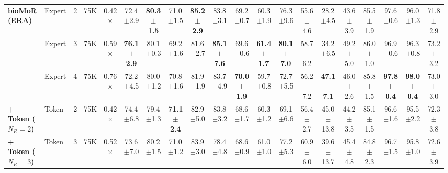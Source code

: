{\begin{tabular}{l l c c c c c c c c c c c c c c c c c c}
\midrule
\textbf{bioMoR (ERA)} & Expert & 2 & 75K & 0.42$\times$ & 72.4{\scriptsize$\pm$2.9} & \cellcolor{bestgreen}\textbf{80.3{\scriptsize$\pm$1.5}} & 71.0{\scriptsize$\pm$1.5} & \cellcolor{bestgreen}\textbf{85.2{\scriptsize$\pm$2.9}} & 83.8{\scriptsize$\pm$3.1} & 69.2{\scriptsize$\pm$0.7} & 60.3{\scriptsize$\pm$1.9} & 76.3{\scriptsize$\pm$9.6} & 55.6{\scriptsize$\pm$4.6} & 28.2{\scriptsize$\pm$4.5} & 43.6{\scriptsize$\pm$3.9} & 85.5{\scriptsize$\pm$1.9} & 97.6{\scriptsize$\pm$0.6} & 96.0{\scriptsize$\pm$1.3} & 71.8{\scriptsize$\pm$2.9} \\
 & Expert & 3 & 75K & 0.59$\times$ & \cellcolor{bestgreen}\textbf{76.1{\scriptsize$\pm$2.9}} & 80.1{\scriptsize$\pm$0.3} & 69.2{\scriptsize$\pm$1.6} & 81.6{\scriptsize$\pm$2.7} & \cellcolor{bestgreen}\textbf{85.1{\scriptsize$\pm$7.6}} & 69.6{\scriptsize$\pm$0.6} & \cellcolor{bestgreen}\textbf{61.4{\scriptsize$\pm$1.7}} & \cellcolor{bestgreen}\textbf{80.1{\scriptsize$\pm$7.0}} & 58.7{\scriptsize$\pm$6.2} & 34.2{\scriptsize$\pm$6.5} & 49.2{\scriptsize$\pm$5.0} & 86.0{\scriptsize$\pm$1.0} & 96.9{\scriptsize$\pm$0.6} & 96.3{\scriptsize$\pm$0.8} & 73.2{\scriptsize$\pm$3.2} \\
 & Expert & 4 & 75K & 0.76$\times$ & 72.2{\scriptsize$\pm$4.5} & 80.0{\scriptsize$\pm$1.2} & 70.8{\scriptsize$\pm$1.6} & 81.9{\scriptsize$\pm$1.9} & 83.7{\scriptsize$\pm$4.9} & \cellcolor{bestgreen}\textbf{70.0{\scriptsize$\pm$1.9}} & 59.7{\scriptsize$\pm$0.8} & 72.7{\scriptsize$\pm$5.5} & 56.2{\scriptsize$\pm$7.2} & \cellcolor{bestgreen}\textbf{47.1{\scriptsize$\pm$7.1}} & 46.0{\scriptsize$\pm$2.6} & 85.8{\scriptsize$\pm$1.5} & \cellcolor{bestgreen}\textbf{97.8{\scriptsize$\pm$0.4}} & \cellcolor{bestgreen}\textbf{98.0{\scriptsize$\pm$0.4}} & 73.0{\scriptsize$\pm$3.0} \\
\textbf{\quad + Token ($N_R{=}2$)} & Token & 2 & 75K & 0.42$\times$ & 74.4{\scriptsize$\pm$6.8} & 79.4{\scriptsize$\pm$1.3} & \cellcolor{bestgreen}\textbf{71.1{\scriptsize$\pm$2.4}} & 82.9{\scriptsize$\pm$5.0} & 83.8{\scriptsize$\pm$3.2} & 68.6{\scriptsize$\pm$1.7} & 60.3{\scriptsize$\pm$1.2} & 69.1{\scriptsize$\pm$6.6} & 56.4{\scriptsize$\pm$2.7} & 45.0{\scriptsize$\pm$13.8} & 44.2{\scriptsize$\pm$3.5} & 85.1{\scriptsize$\pm$1.5} & 96.6{\scriptsize$\pm$1.6} & 95.5{\scriptsize$\pm$2.2} & 72.3{\scriptsize$\pm$3.8} \\
\textbf{\quad + Token ($N_R{=}3$)} & Token & 3 & 75K & 0.52$\times$ & 73.6{\scriptsize$\pm$7.0} & 80.2{\scriptsize$\pm$1.5} & 71.0{\scriptsize$\pm$1.2} & 83.9{\scriptsize$\pm$3.0} & 78.4{\scriptsize$\pm$4.8} & 68.6{\scriptsize$\pm$0.9} & 61.0{\scriptsize$\pm$1.0} & 77.2{\scriptsize$\pm$5.3} & 60.9{\scriptsize$\pm$6.0} & 39.6{\scriptsize$\pm$13.7} & 45.4{\scriptsize$\pm$4.8} & 84.8{\scriptsize$\pm$2.3} & 96.7{\scriptsize$\pm$1.5} & 95.8{\scriptsize$\pm$1.0} & 72.6{\scriptsize$\pm$3.9} \\

\end{tabular}}
